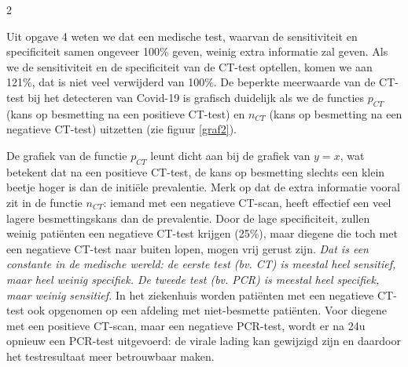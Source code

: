 \begin{multicols}{2}

\noindent Uit opgave 4 weten we dat een medische test, waarvan de sensitiviteit en specificiteit samen ongeveer 100\% geven, weinig extra informatie zal geven. Als we de sensitiviteit en de specificiteit van de CT-test optellen, komen we aan 121\%, dat is niet veel verwijderd van 100\%. De beperkte meerwaarde van de CT-test bij het detecteren van Covid-19 is grafisch duidelijk als we de functies $p_{CT}$ (kans op besmetting na een positieve CT-test) en $n_{CT}$ (kans op besmetting na een negatieve CT-test) uitzetten (zie figuur \ref{graf2}). 


 De grafiek van de functie $p_{CT}$ leunt dicht aan bij de grafiek van $y=x$, wat betekent dat na een positieve CT-test, de kans op besmetting slechts een klein beetje hoger is dan de initiële prevalentie. Merk op dat de extra informatie vooral zit in de functie $n_{CT}$: iemand met een negatieve CT-scan, heeft effectief een veel lagere besmettingskans dan de prevalentie. Door de lage specificiteit, zullen weinig patiënten een negatieve CT-test krijgen (25\%), maar diegene die toch met een negatieve CT-test naar buiten lopen, mogen vrij gerust zijn.\textit{ Dat is een constante in de medische wereld: de eerste test (bv. CT) is meestal heel sensitief, maar heel weinig specifiek. De tweede test (bv. PCR) is meestal heel specifiek, maar weinig sensitief.} In het ziekenhuis worden patiënten met een negatieve CT-test ook opgenomen op een afdeling met niet-besmette patiënten. Voor diegene met een positieve CT-scan, maar een negatieve PCR-test, wordt er na 24u opnieuw een PCR-test uitgevoerd: de virale lading kan gewijzigd zijn en daardoor het testresultaat meer betrouwbaar maken.



\end{multicols}
